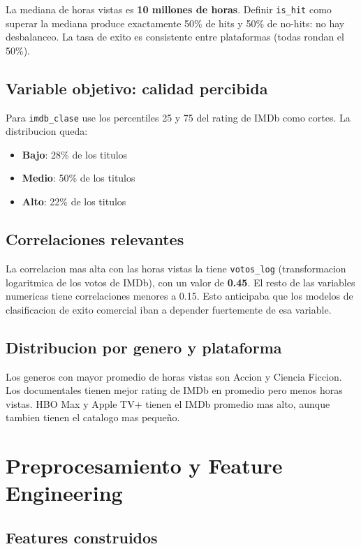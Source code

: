 \documentclass[12pt, a4paper]{article}
\begin{document}
La mediana de horas vistas es \textbf{10 millones de horas}. Definir \texttt{is\_hit} como superar la mediana produce exactamente 50\% de hits y 50\% de no-hits: no hay desbalanceo. La tasa de exito es consistente entre plataformas (todas rondan el 50\%).

\subsection{Variable objetivo: calidad percibida}

Para \texttt{imdb\_clase} use los percentiles 25 y 75 del rating de IMDb como cortes. La distribucion queda:
\begin{itemize}
\item \textbf{Bajo}: 28\% de los titulos
\item \textbf{Medio}: 50\% de los titulos
\item \textbf{Alto}: 22\% de los titulos
\end{itemize}

\subsection{Correlaciones relevantes}

La correlacion mas alta con las horas vistas la tiene \texttt{votos\_log} (transformacion logaritmica de los votos de IMDb), con un valor de \textbf{0.45}. El resto de las variables numericas tiene correlaciones menores a 0.15. Esto anticipaba que los modelos de clasificacion de exito comercial iban a depender fuertemente de esa variable.

\subsection{Distribucion por genero y plataforma}

Los generos con mayor promedio de horas vistas son Accion y Ciencia Ficcion. Los documentales tienen mejor rating de IMDb en promedio pero menos horas vistas. HBO Max y Apple TV+ tienen el IMDb promedio mas alto, aunque tambien tienen el catalogo mas pequeño.

\section{Preprocesamiento y Feature Engineering}
\label{sec:features}

\subsection{Features construidos}
\end{document}
